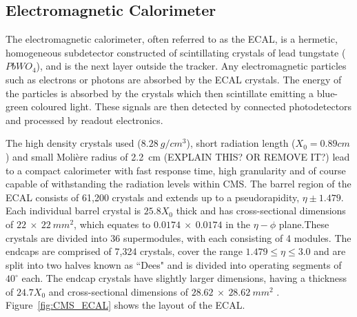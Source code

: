 % 


\subsection{Electromagnetic Calorimeter}
\label{ss:Ecal}
The electromagnetic calorimeter, often referred to as the ECAL, is a hermetic, homogeneous
subdetector constructed of scintillating crystals of lead tungstate ($PbWO_{4}$), and is the next layer
outside the tracker. Any electromagnetic particles such as electrons or photons are absorbed by the ECAL
crystals. The energy of the particles is absorbed by the crystals which then scintillate emitting a blue-green
coloured light. These signals are then detected by connected photodetectors and processed by readout
electronics.

The high density crystals used ($8.28~g/cm^{3}$), short radiation length ($X_{0} = 0.89cm$) and small
Moli\`{e}re radius of 2.2~cm (EXPLAIN THIS? OR REMOVE IT?) lead to a compact calorimeter with fast response
time, high granularity and of course capable of withstanding the radiation levels within CMS. The barrel
region of the ECAL consists of 61,200 crystals and extends up to a pseudorapidity, $\eta\pm1.479$. Each
individual barrel crystal is $25.8X_{0}$ thick and has cross-sectional dimensions of $22~\times~22~mm^{2}$,
which equates to $0.0174~\times~0.0174$ in the $\eta-\phi$ plane.These crystals are divided into 36
supermodules, with each consisting of 4 modules. The endcaps are comprised of 7,324 crystals, cover the range
$1.479\leq\eta\leq3.0$ and are split into two halves known as ``Dees" and is divided into operating segments
of $40^{\circ}$ each. The endcap crystals have slightly larger dimensions, having a thickness of $24.7X_{0}$
and cross-sectional dimensions of $28.62~\times~28.62~mm^{2}$ \cite{CMS_experiment,ECAL_frontend_monitoring}.
Figure~\ref{fig:CMS_ECAL} shows the layout of the ECAL.

